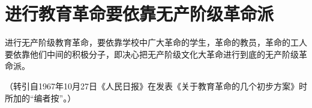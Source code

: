 \section[进行教育革命要依靠无产阶级革命派（一九六七年十月二十五日）]{进行教育革命要依靠无产阶级革命派}


进行无产阶级教育革命，要依靠学校中广大革命的学生，革命的教员，革命的工人要依靠他们中间的积极分子，即决心把无产阶级文化大革命进行到底的无产阶级革命派。

{\raggedleft （转引自1967年10月27日《人民日报》在发表《关于教育革命的几个初步方案》时所加的“编者按”。）\par}


